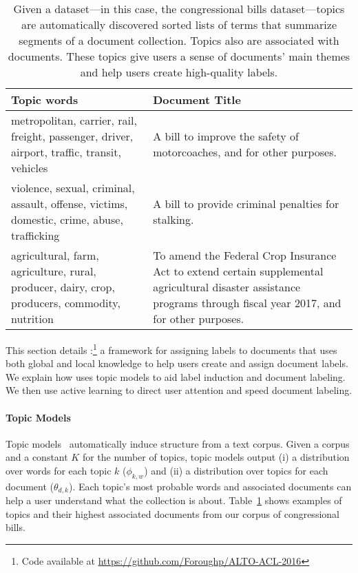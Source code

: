 
\begin{table}[t!]
\small
\begin{tabular}{ p{2.4cm}  p{4.3cm} }
    \hline
    Topic words & Document Title
    \tabularnewline \hline \hline

metropolitan, carrier, rail, freight, passenger, driver, airport, traffic, transit, vehicles &
A bill to improve the safety of motorcoaches, and for other purposes.
    \tabularnewline
    \hline
	violence, sexual, criminal, assault, offense, victims, domestic, crime, abuse, trafficking
		& A bill to provide criminal penalties for stalking.
\tabularnewline
\hline
agricultural, farm, agriculture, rural, producer, dairy, crop, producers, commodity, nutrition
		& To amend the Federal Crop Insurance Act to extend certain supplemental agricultural disaster assistance programs through fiscal year 2017, and for other purposes.
\tabularnewline
\hline
\end{tabular}
\caption{
  Given a dataset---in this case, the  congressional bills
  dataset---topics are automatically discovered sorted lists of terms that summarize segments of a document collection.  Topics also
  are  associated with documents.  These topics give users a
  sense of documents' main themes and help users create high-quality labels.}
\label{tab:doc_topics}
\end{table}


This section details \name{}:\footnote{
\let\hyper@linkurl\saved@hyper@linkurl
Code available at \url{https://github.com/Foroughp/ALTO-ACL-2016}
\NoHyper } a framework for assigning labels to
documents that uses both global and local knowledge to help users
create and assign document labels. We explain how
\name{} uses topic models to aid label induction and document
labeling. We then use active learning to direct user attention and
speed document labeling.











\paragraph{Topic Models}

Topic models~\cite{Blei-03} automatically induce structure from a text
corpus.  Given a corpus and a constant $K$ for the number of topics,
topic models output (i) a distribution over words for each topic $k$
($\phi_{k,w}$) and (ii) a distribution over topics for each document
($\theta_{d,k}$).  Each topic's most probable words and associated
documents can help a user understand what the collection is
about. Table~\ref{tab:doc_topics} shows examples of topics and their
highest associated documents from our corpus of  congressional
bills.

